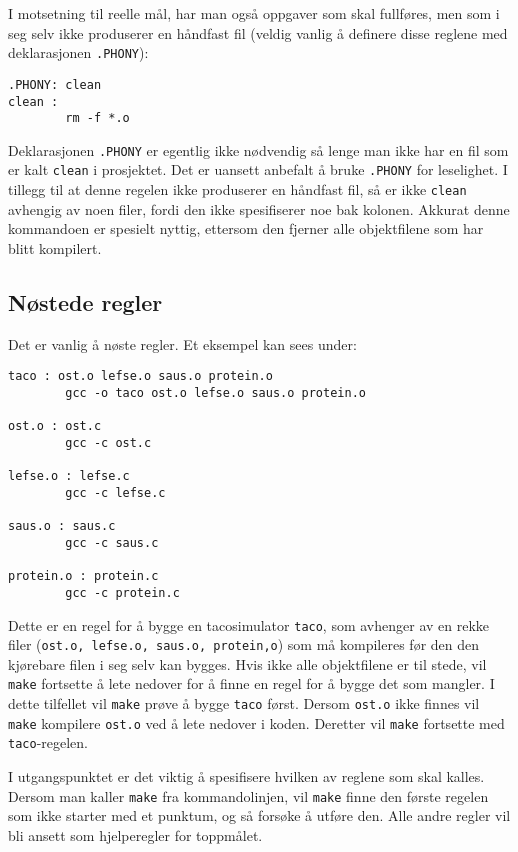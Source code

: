 \begin{alphasection}
I motsetning til reelle mål, har man også oppgaver som skal fullføres, men som i seg selv ikke produserer en håndfast fil (veldig vanlig å definere disse reglene med deklarasjonen \verb|.PHONY|):

\begin{lstlisting}
.PHONY: clean
clean :
        rm -f *.o
\end{lstlisting}

Deklarasjonen \verb|.PHONY| er egentlig ikke nødvendig så lenge man ikke har en fil som er kalt \verb|clean| i prosjektet. Det er uansett anbefalt å bruke \verb|.PHONY| for leselighet. I tillegg til at denne regelen ikke produserer en håndfast fil, så er ikke \verb|clean| avhengig av noen filer, fordi den ikke spesifiserer noe bak kolonen. Akkurat denne kommandoen er spesielt nyttig, ettersom den fjerner alle objektfilene som har blitt kompilert. 

\subsection{Nøstede regler}

Det er vanlig å nøste regler. Et eksempel kan sees under:

\begin{lstlisting}
taco : ost.o lefse.o saus.o protein.o
        gcc -o taco ost.o lefse.o saus.o protein.o

ost.o : ost.c
        gcc -c ost.c

lefse.o : lefse.c
        gcc -c lefse.c

saus.o : saus.c
        gcc -c saus.c

protein.o : protein.c
        gcc -c protein.c
\end{lstlisting}

Dette er en regel for å bygge en tacosimulator \verb|taco|, som avhenger av en rekke filer (\verb|ost.o, lefse.o, saus.o, protein,o|) som må kompileres før den den kjørebare filen i seg selv kan bygges. Hvis ikke alle objektfilene er til stede, vil \verb|make| fortsette å lete nedover for å finne en regel for å bygge det som mangler. I dette tilfellet vil \verb|make| prøve å bygge \verb|taco| først. Dersom \verb|ost.o| ikke finnes vil \verb|make| kompilere \verb|ost.o| ved å lete nedover i koden. Deretter vil \verb|make| fortsette med \verb|taco|-regelen.

I utgangspunktet er det viktig å spesifisere hvilken av reglene som skal kalles. Dersom man kaller \verb|make| fra kommandolinjen, vil \verb|make| finne den første regelen
som ikke starter med et punktum, og så forsøke å utføre den. Alle andre
regler vil bli ansett som hjelperegler for toppmålet.


\end{alphasection}
